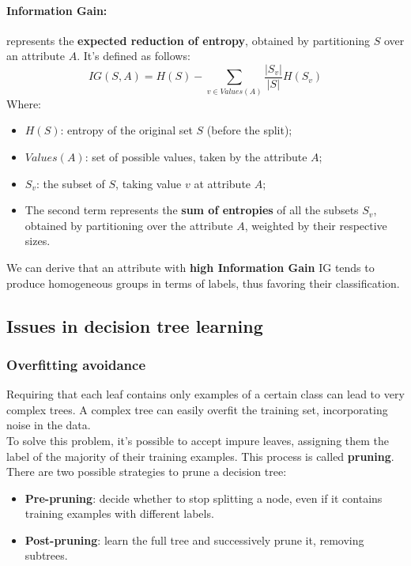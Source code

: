 \paragraph{Information Gain:} represents the \textbf{expected reduction of entropy}, obtained by partitioning $S$ over an attribute $A$.
It's defined as follows:
\begin{equation}
\label{eq:information-gain}
    IG(S,A) = H(S) - \sum_{v \in Values(A)}\frac{|S_v|}{|S|}H(S_v)
\end{equation}
Where:
\begin{itemize}
    \item $H(S)$: entropy of the original set $S$ (before the split);
    \item $Values(A)$: set of possible values, taken by the attribute $A$;
    \item $S_v$: the subset of $S$, taking value $v$ at attribute $A$;
    \item The second term represents the \textbf{sum of entropies} of all the subsets $S_v$, 
    obtained by partitioning over the attribute $A$, weighted by their respective sizes.
\end{itemize}
We can derive that an attribute with \textbf{high Information Gain} IG tends to produce homogeneous groups in terms of labels, 
thus favoring their classification.

\subsection{Issues in decision tree learning}

\subsubsection{Overfitting avoidance}
Requiring that each leaf contains only examples of a certain class can lead to very complex trees. A complex tree can easily overfit the training set, incorporating noise in the data.
\\To solve this problem, it's possible to accept impure leaves, assigning them the label of the majority of their training examples. This process is called \textbf{pruning}.
There are two possible strategies to prune a decision tree:
\begin{itemize}
    \item \textbf{Pre-pruning}: decide whether to stop splitting a node, even if it contains training examples with different labels.
    \item \textbf{Post-pruning}: learn the full tree and successively prune it, removing subtrees.
\end{itemize}

